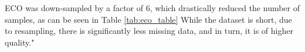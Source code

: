 ECO was down-sampled by a factor of 6, which drastically reduced the number of samples, as can be seen in Table \ref{tab:eco_table} 
While the dataset is short, due to resampling, there is significantly less missing data, and in turn, it is of higher quality."

